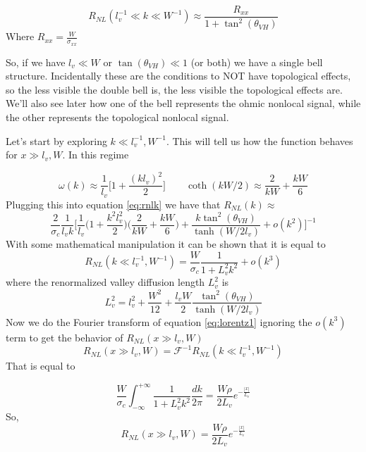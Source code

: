 \[
R_{NL}(l_v^{-1}\ll k \ll W^{-1})\approx \frac{R_{xx}}{1+\tan^2(\theta_{VH})}    
\]
Where $R_{xx}=\frac{W}{\sigma_{xx}}$

So, if we have $l_v\ll W$ or $\tan(\theta_{VH})\ll 1$ (or both) we have a single bell structure. Incidentally these are the conditions to NOT have topological effects, so the less visible the double bell is, the less visible the topological effects are. We'll also see later how one of the bell represents the ohmic nonlocal signal, while the other represents the topological nonlocal signal. 


Let's start by exploring $k\ll l_v^{-1},W^{-1}$. This will tell us how the function behaves for $x\gg l_v,W$. In this regime 

\begin{equation}
    \omega(k)\approx \frac 1{l_v}\bigg[1+\frac{(kl_v)^2}2\bigg]\quad\quad
    \coth (kW/2)\approx \frac 2{kW} + \frac{kW}6
\end{equation}
Plugging this into equation \ref{eq:rnlk} we have that $R_{NL}(k)\approx$
\begin{equation}
    \frac 2{\sigma_c}\frac 1 {l_vk}\Bigg[
        \frac 1{l_v}\bigg(1+\frac{k^2l_v^2}{2}\bigg)\bigg(\frac 2{kW} + \frac{kW}6\bigg)+
        \frac{k\tan^2(\theta_{VH})}{\tanh(W/2l_v)} + o(k^2)
    \Bigg]^{-1}
\end{equation}
With some mathematical manipulation it can be shown that it is equal to 
\begin{equation}
    R_{NL}(k\ll l_v^{-1},W^{-1})=
    \frac W{\sigma_c}\frac 1{1+L_v^2k^2} + o(k^3)
    \label{eq:lorentz1}
\end{equation}
where the renormalized valley diffusion length $L_v^2$ is 
\begin{equation}
    L_v^2 = l_v^2+\frac {W^2}{12} +\frac{l_vW}2 \frac{\tan^2(\theta_{VH})}{\tanh(W/2l_v)}
\end{equation}
Now we do the Fourier transform of equation \ref{eq:lorentz1} ignoring the $o(k^3)$ term to get the behavior of $R_{NL}(x\gg l_v,W)$
\begin{equation}
    R_{NL}(x\gg l_v,W)=\mathcal F^{-1}R_{NL}(k\ll l_v^{-1},W^{-1}) 
    \label{eq:rxg}
\end{equation}
That is equal to 

\begin{equation}
    \frac W{\sigma_c}\int_{-\infty}^{+\infty}
    \frac 1{1+L_v^2k^2}
    \frac {dk}{2\pi}=
    \frac{W\rho}{2L_v}e^{-\frac{|x|}{L_v}}
\end{equation}
So,
\begin{equation}
    R_{NL}(x\gg l_v,W)=\frac{W\rho}{2L_v}e^{-\frac{|x|}{L_v}}
    \label{eq:rxl}
\end{equation}


